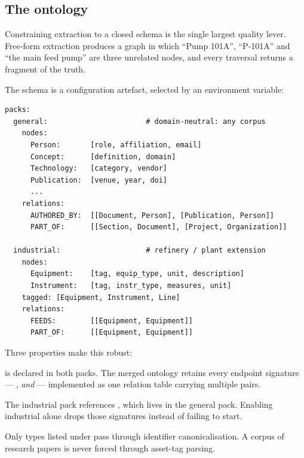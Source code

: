 \subsection{The ontology}

Constraining extraction to a closed schema is the single largest quality lever.
Free-form extraction produces a graph in which ``Pump 101A'', ``P-101A'' and
``the main feed pump'' are three unrelated nodes, and every traversal returns a
fragment of the truth.

The schema is a configuration artefact, selected by an environment variable:

\begin{lstlisting}[language=yamlx]
packs:
  general:                       # domain-neutral: any corpus
    nodes:
      Person:       [role, affiliation, email]
      Concept:      [definition, domain]
      Technology:   [category, vendor]
      Publication:  [venue, year, doi]
      ...
    relations:
      AUTHORED_BY:  [[Document, Person], [Publication, Person]]
      PART_OF:      [[Section, Document], [Project, Organization]]

  industrial:                    # refinery / plant extension
    nodes:
      Equipment:    [tag, equip_type, unit, description]
      Instrument:   [tag, instr_type, measures, unit]
    tagged: [Equipment, Instrument, Line]
    relations:
      FEEDS:        [[Equipment, Equipment]]
      PART_OF:      [[Equipment, Equipment]]
\end{lstlisting}

Three properties make this robust:

\begin{description}[leftmargin=0pt,style=nextline]
\item[Packs merge rather than overwrite.]  is declared in both
packs. The merged ontology retains every endpoint signature
--- , 
\emph{and}  --- implemented as one
relation table carrying multiple  pairs.
\item[Cross-pack references degrade gracefully.] The industrial pack references
, which lives in the general pack. Enabling industrial alone drops
those signatures instead of failing to start.
\item[Tagging is opt-in.] Only types listed under  pass through
identifier canonicalisation. A corpus of research papers is never forced
through asset-tag parsing.
\end{description}

